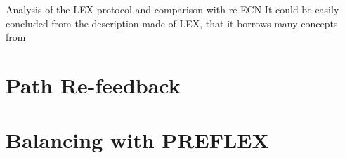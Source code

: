 Analysis of the LEX protocol and comparison with re-ECN
It could be easily concluded from the description made of LEX, that it borrows  many concepts from 
\section{Path Re-feedback}
\section{Balancing with PREFLEX}
